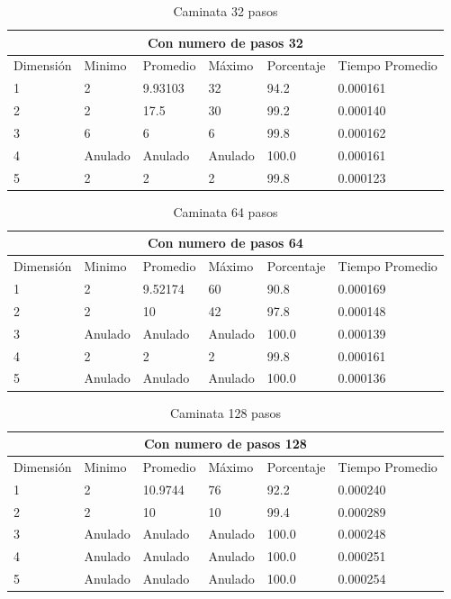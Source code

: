 \documentclass{article}
\begin{document}
\begin{table}[H]
\centering
\begin{tabular}{ |p{2cm}||p{2cm}|p{2cm}|p{2cm}|p{2cm  }|p{2cm}|}
 \hline
 \multicolumn{6}{|c|}{Con numero de pasos 32} \\
 \hline
 Dimensión&Minimo&Promedio&Máximo&Porcentaje&Tiempo Promedio\\
 \hline
 1   & 2       & 9.93103  & 32       & 94.2   & 0.000161\\
 2   & 2       & 17.5     & 30       & 99.2   & 0.000140\\
 3   & 6       & 6        & 6        & 99.8   & 0.000162\\
 4   & Anulado & Anulado  & Anulado  & 100.0  & 0.000161\\
 5   & 2       & 2        & 2        & 99.8   & 0.000123\\
 \hline
\end{tabular}
\caption{Caminata 32 pasos}
\label{table:8}
\end{table}

\begin{table}[H]
\centering
\begin{tabular}{ |p{2cm}||p{2cm}|p{2cm}|p{2cm}|p{2cm  }|p{2cm}|}
 \hline
 \multicolumn{6}{|c|}{Con numero de pasos 64} \\
 \hline
 Dimensión&Minimo&Promedio&Máximo&Porcentaje&Tiempo Promedio\\
 \hline
 1   & 2       & 9.52174  & 60       & 90.8   & 0.000169\\
 2   & 2       & 10       & 42       & 97.8   & 0.000148\\
 3   & Anulado & Anulado  & Anulado  & 100.0  & 0.000139\\
 4   & 2       & 2        & 2        & 99.8   & 0.000161\\
 5   & Anulado & Anulado  & Anulado  & 100.0  & 0.000136\\
 \hline
\end{tabular}
\caption{Caminata 64 pasos}
\label{table:9}
\end{table}

\begin{table}[H]
\centering
\begin{tabular}{ |p{2cm}||p{2cm}|p{2cm}|p{2cm}|p{2cm  }|p{2cm}|}
 \hline
 \multicolumn{6}{|c|}{Con numero de pasos 128} \\
 \hline
 Dimensión&Minimo&Promedio&Máximo&Porcentaje&Tiempo Promedio\\
 \hline
 1   & 2       & 10.9744  & 76       & 92.2   & 0.000240\\
 2   & 2       & 10       & 10       & 99.4   & 0.000289\\
 3   & Anulado & Anulado  & Anulado  & 100.0  & 0.000248\\
 4   & Anulado & Anulado  & Anulado  & 100.0  & 0.000251\\
 5   & Anulado & Anulado  & Anulado  & 100.0  & 0.000254\\
 \hline
\end{tabular}
\caption{Caminata 128 pasos}
\label{table:10}
\end{table}
\end{document}
